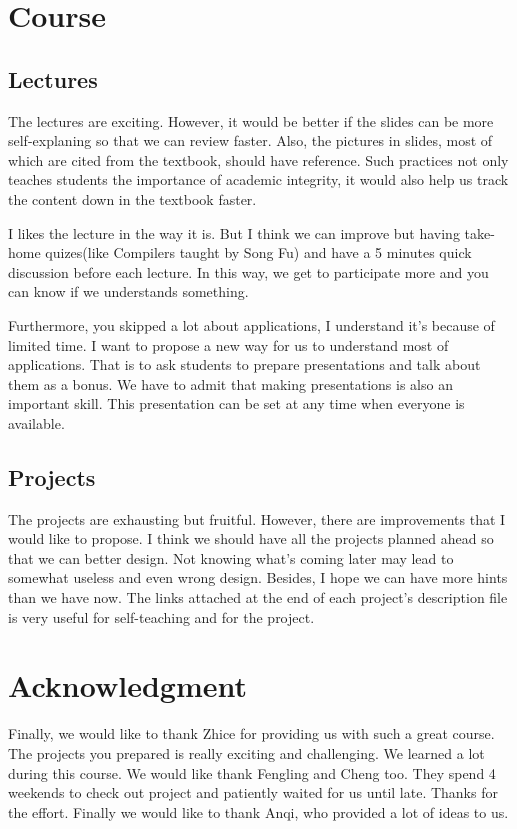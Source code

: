 \documentclass[conference,compsoc]{IEEEtran}
\begin{document}
\section{Course}
	
	\subsection{Lectures}
		The lectures are exciting. 
		However, it would be better if the slides can be more self-explaning so that we can review faster.
		Also, the pictures in slides, most of which are cited from the textbook, should have reference.
		Such practices not only teaches students the importance of academic integrity, it would also help us track the content down in the textbook faster.
		\par
		I likes the lecture in the way it is. 
		But I think we can improve but having take-home quizes(like Compilers taught by Song Fu) and have a 5 minutes quick discussion before each lecture.
		In this way, we get to participate more and you can know if we understands something.
		\par
		Furthermore, you skipped a lot about applications, I understand it's because of limited time.
		I want to propose a new way for us to understand most of applications.
		That is to ask students to prepare presentations and talk about them as a bonus.
		We have to admit that making presentations is also an important skill.
		This presentation can be set at any time when everyone is available.

	\subsection{Projects}
		The projects are exhausting but fruitful. 
		However, there are improvements that I would like to propose.
		I think we should have all the projects planned ahead so that we can better design.
		Not knowing what's coming later may lead to somewhat useless and even wrong design.
		Besides, I hope we can have more hints than we have now. 
		The links attached at the end of each project's description file is very useful for self-teaching and for the project.

\section*{Acknowledgment}
	Finally, we would like to thank Zhice for providing us with such a great course.
	The projects you prepared is really exciting and challenging. 
	We learned a lot during this course.
	We would like thank Fengling and Cheng too. 
	They spend 4 weekends to check out project and patiently waited for us until late.
	Thanks for the effort.
	Finally we would like to thank Anqi, who provided a lot of ideas to us.





\end{document}
